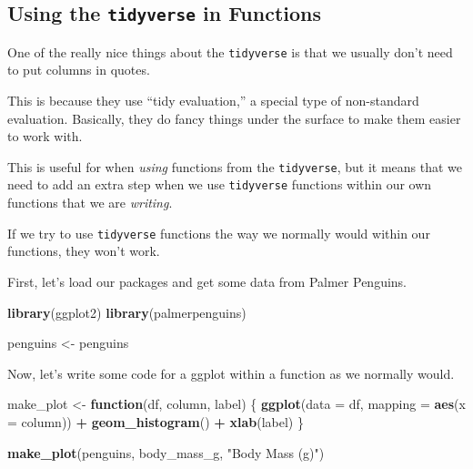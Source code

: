 \documentclass[
]{article}
\newenvironment{Shaded}{\begin{snugshade}}{\end{snugshade}}
\newcommand{\AttributeTok}[1]{\textcolor[rgb]{0.13,0.29,0.53}{#1}}
\newcommand{\ControlFlowTok}[1]{\textcolor[rgb]{0.13,0.29,0.53}{\textbf{#1}}}
\newcommand{\FunctionTok}[1]{\textcolor[rgb]{0.13,0.29,0.53}{\textbf{#1}}}
\newcommand{\NormalTok}[1]{#1}
\newcommand{\OtherTok}[1]{\textcolor[rgb]{0.56,0.35,0.01}{#1}}
\newcommand{\SpecialCharTok}[1]{\textcolor[rgb]{0.81,0.36,0.00}{\textbf{#1}}}
\newcommand{\StringTok}[1]{\textcolor[rgb]{0.31,0.60,0.02}{#1}}
\begin{document}
\subsection{\texorpdfstring{Using the \texttt{tidyverse} in
Functions}{Using the tidyverse in Functions}}\label{using-the-tidyverse-in-functions}

One of the really nice things about the \texttt{tidyverse} is that we
usually don't need to put columns in quotes.

This is because they use ``tidy evaluation,'' a special type of
non-standard evaluation. Basically, they do fancy things under the
surface to make them easier to work with.

This is useful for when \emph{using} functions from the
\texttt{tidyverse}, but it means that we need to add an extra step when
we use \texttt{tidyverse} functions within our own functions that we are
\emph{writing}.

If we try to use \texttt{tidyverse} functions the way we normally would
within our functions, they won't work.

First, let's load our packages and get some data from Palmer Penguins.

\begin{Shaded}
\begin{Highlighting}[]
\FunctionTok{library}\NormalTok{(ggplot2)}
\FunctionTok{library}\NormalTok{(palmerpenguins)}

\NormalTok{penguins }\OtherTok{\textless{}{-}}\NormalTok{ penguins}
\end{Highlighting}
\end{Shaded}

Now, let's write some code for a ggplot within a function as we normally
would.

\begin{Shaded}
\begin{Highlighting}[]
\NormalTok{make\_plot }\OtherTok{\textless{}{-}} \ControlFlowTok{function}\NormalTok{(df, column, label) \{}
  \FunctionTok{ggplot}\NormalTok{(}\AttributeTok{data =}\NormalTok{ df, }\AttributeTok{mapping =} \FunctionTok{aes}\NormalTok{(}\AttributeTok{x =}\NormalTok{ column)) }\SpecialCharTok{+}
    \FunctionTok{geom\_histogram}\NormalTok{() }\SpecialCharTok{+}
    \FunctionTok{xlab}\NormalTok{(label)}
\NormalTok{\}}

\FunctionTok{make\_plot}\NormalTok{(penguins, body\_mass\_g, }\StringTok{"Body Mass (g)"}\NormalTok{)}
\end{Highlighting}
\end{Shaded}
\end{document}
